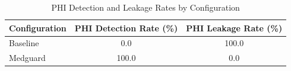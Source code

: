 \begin{table}[h]
\centering
\begin{tabular}{lcc}
\toprule
Configuration & PHI Detection Rate (\%) & PHI Leakage Rate (\%) \\
\midrule
Baseline & 0.0 & 100.0 \\
Medguard & 100.0 & 0.0 \\
\bottomrule
\end{tabular}
\caption{PHI Detection and Leakage Rates by Configuration}
\label{tab:phi-leakage}
\end{table}